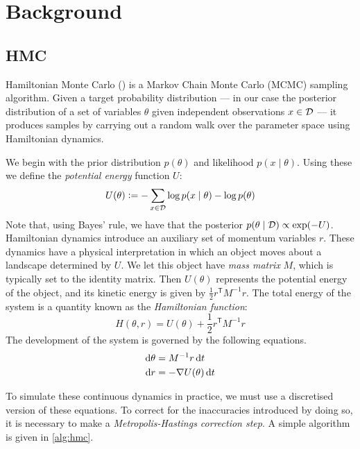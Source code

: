 
\section{Background}

\subsection{HMC}

Hamiltonian Monte Carlo (\cite{duane-hmc,neal-hmc}) is a Markov Chain Monte Carlo (MCMC) sampling algorithm. Given a target probability distribution — in our case the posterior distribution of a set of variables $\theta$ given independent observations $x \in \mathcal{D}$ — it produces samples by carrying out a random walk over the parameter space using Hamiltonian dynamics.

We begin with the prior distribution $p(\theta)$ and likelihood $p(x \mid \theta)$. Using these we define the \emph{potential energy} function $U$:
\begin{equation*}
    U(\theta) \vcentcolon= - \sum_{x \in \mathcal{D}}\log p(x \mid \theta) - \log p(\theta)
\end{equation*}
Note that, using Bayes' rule, we have that the posterior $p(\theta \mid \mathcal{D}) \propto \exp(-U)$. Hamiltonian dynamics introduce an auxiliary set of momentum variables $r$. These dynamics have a physical interpretation in which an object moves about a landscape determined by $U$. We let this object have \emph{mass matrix} $M$, which is typically set to the identity matrix. Then $U(\theta)$ represents the potential energy of the object, and its kinetic energy is given by $\frac 1 2 r^{\mathsf T} M^{-1} r$. The total energy of the system is a quantity known as the \emph{Hamiltonian function}:
\begin{equation*}
    H(\theta, r) = U(\theta) + \frac 1 2 r^{\mathsf T} M^{-1} r
\end{equation*}
The development of the system is governed by the following equations.
\begin{align*}
    \dif\theta &= M^{-1}r \dif t \\
    \dif r &= - \nabla U(\theta) \dif t
\end{align*}

To simulate these continuous dynamics in practice, we must use a discretised version of these equations. To correct for the inaccuracies introduced by doing so, it is necessary to make a \emph{Metropolis-Hastings correction step}. A simple algorithm is given in \cref{alg:hmc}.

